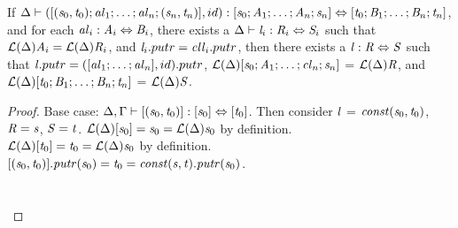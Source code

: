 \begin{lemma}
\label{lem:id-clause}
If $\Delta \vdash ([(\mathit{s}_0,\mathit{t}_0);\mathit{al}_1 ; \ldots ; \mathit{al}_n;(\mathit{s}_n,\mathit{t}_n)],id) : [\mathit{s}_0 ; \mathit{A}_1 ; \ldots ; \mathit{A}_n; \mathit{s}_n] \Leftrightarrow [\mathit{t}_0 ; \mathit{B}_1 ; \ldots ; \mathit{B}_n ; \mathit{t}_n]$,
and for each $\mathit{al}_i : \mathit{A}_i \Leftrightarrow \mathit{B}_i$,
there exists a $\Delta \vdash \mathit{l}_i : \mathit{R}_i \Leftrightarrow \mathit{S}_i$ such that
$\mathcal{L}(\Delta){\mathit{A}_i}=\mathcal{L}(\Delta){\mathit{R}_i}$, and $\mathit{l}_i.putr = \mathit{cll}_i.putr$,
then there exists a $\mathit{l} : \mathit{R} \Leftrightarrow \mathit{S}$ such that $\mathit{l}.putr = ([\mathit{al}_1 ; \ldots ; \mathit{al}_n],id).putr$, $\mathcal{L}(\Delta){[\mathit{s}_0 ; \mathit{A}_1 ; \ldots ; \mathit{cl}_n ; \mathit{s}_n]}$ = $\mathcal{L}(\Delta){\mathit{R}}$,
and $\mathcal{L}(\Delta){[\mathit{t}_0 ; \mathit{B}_1 ; \ldots ; \mathit{B}_n ; \mathit{t}_n]}$ = $\mathcal{L}(\Delta){\mathit{S}}$.
\begin{proof}
Base case: $\Delta, \Gamma \vdash [(\mathit{s}_0,\mathit{t}_0)] : [\mathit{s}_0] \Leftrightarrow [\mathit{t}_0]$.
Then consider $\mathit{l}$ = $\mathit{const}(\mathit{s}_0,\mathit{t}_0)$, $\mathit{R} = \mathit{s}$, $\mathit{S} = \mathit{t}$.
$\mathcal{L}(\Delta){[\mathit{s}_0]} = \mathit{s}_0 = \mathcal{L}(\Delta){\mathit{s}_0}$ by definition.\\
$\mathcal{L}(\Delta){[\mathit{t}_0]} = \mathit{t}_0 = \mathcal{L}(\Delta){\mathit{s}_0}$ by definition.\\
$[(\mathit{s}_0,\mathit{t}_0)].\mathit{putr}(\mathit{s}_0)=\mathit{t}_0=\mathit{const}(\mathit{s},\mathit{t}).\mathit{putr}(\mathit{s}_0)$.
\\\\\\


\end{proof}
\end{lemma}
